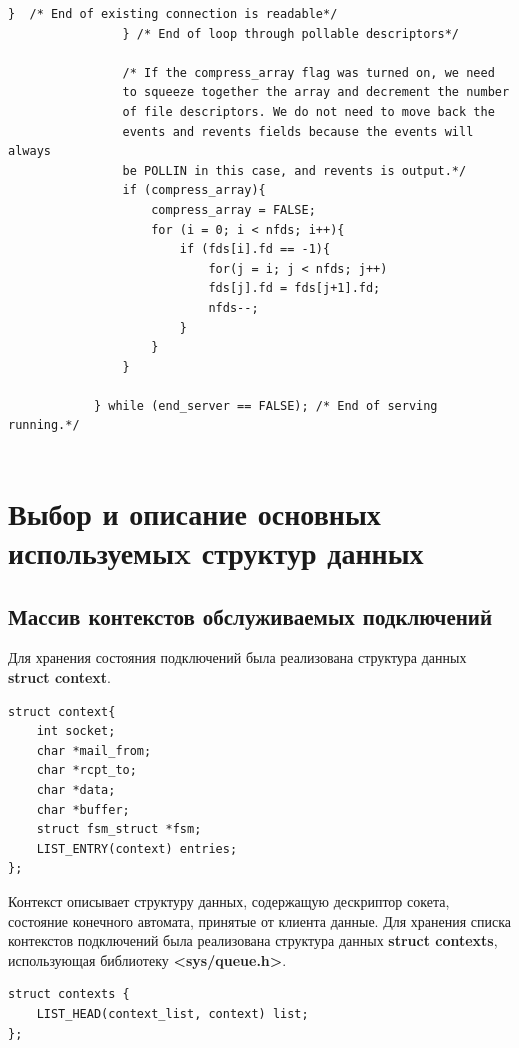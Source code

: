 \begin{lstlisting}[caption={Логика работы рабочего процесса},label=lst:pseudoworker]
                    }  /* End of existing connection is readable*/
                } /* End of loop through pollable descriptors*/

                /* If the compress_array flag was turned on, we need
                to squeeze together the array and decrement the number
                of file descriptors. We do not need to move back the
                events and revents fields because the events will always
                be POLLIN in this case, and revents is output.*/
                if (compress_array){
                    compress_array = FALSE;
                    for (i = 0; i < nfds; i++){
                        if (fds[i].fd == -1){
                            for(j = i; j < nfds; j++)
                            fds[j].fd = fds[j+1].fd;
                            nfds--;
                        }
                    }
                }

            } while (end_server == FALSE); /* End of serving running.*/
		
\end{lstlisting}




\section{Выбор и описание основных используемыx структур данных}

\subsection{Массив контекстов обслуживаемых подключений}
Для хранения состояния подключений была реализована структура данных \textbf{struct context}.

\begin{verbatim}
struct context{
    int socket;
    char *mail_from;
    char *rcpt_to;
    char *data;
    char *buffer;
    struct fsm_struct *fsm;
    LIST_ENTRY(context) entries;
};
\end{verbatim}

Контекст описывает структуру данных, содержащую дескриптор сокета, состояние конечного автомата, принятые от клиента данные.
Для хранения списка контекстов подключений была реализована структура данных \textbf{struct contexts}, использующая библиотеку \textbf{<sys/queue.h>}.

\begin{verbatim}
struct contexts {
    LIST_HEAD(context_list, context) list;
};
\end{verbatim}

